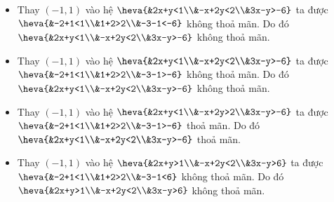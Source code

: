 \begin{ex}
{\begin{itemize}
			\item Thay $(-1,1)$ vào hệ $\heva{&2x+y<1\\&-x+2y<2\\&3x-y>-6}$ ta được $\heva{&-2+1<1\\&1+2>2\\&-3-1<-6}$ không thoả mãn. Do đó $\heva{&2x+y<1\\&-x+2y<2\\&3x-y>-6}$ không thoả mãn.
			\item Thay $(-1,1)$ vào hệ $\heva{&2x+y<1\\&-x+2y<2\\&3x-y>-6}$ ta được $\heva{&-2+1<1\\&1+2>2\\&-3-1>-6}$ không thoả mãn. Do đó $\heva{&2x+y<1\\&-x+2y<2\\&3x-y>-6}$ không thoả mãn.
			\item Thay $(-1,1)$ vào hệ $\heva{&2x+y<1\\&-x+2y>2\\&3x-y>-6}$ ta được $\heva{&-2+1<1\\&1+2>2\\&-3-1>-6}$ thoả mãn. Do đó $\heva{&2x+y<1\\&-x+2y<2\\&3x-y>-6}$ thoả mãn.
			\item Thay $(-1,1)$ vào hệ $\heva{&2x+y>1\\&-x+2y<2\\&3x-y>6}$ ta được $\heva{&-2+1<1\\&1+2>2\\&-3-1<6}$ không thoả mãn. Do đó $\heva{&2x+y>1\\&-x+2y<2\\&3x-y>6}$ không thoả mãn.
		\end{itemize} }
\end{ex}

